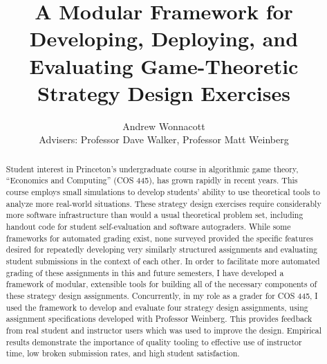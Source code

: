 \documentclass[pageno]{jpaper}
\begin{document}
\title{
A Modular Framework for Developing, Deploying, and Evaluating Game-Theoretic Strategy Design Exercises}

\author{Andrew Wonnacott\\
  Advisers: Professor Dave Walker, Professor Matt Weinberg}

\date{}
\maketitle

\thispagestyle{empty}
\doublespacing{}
\begin{abstract}
  Student interest in Princeton's undergraduate course in algorithmic game theory, ``Economics and Computing'' (COS 445), has grown rapidly in recent years.
  This course employs small simulations to develop students' ability to use theoretical tools to analyze more real-world situations.
  These strategy design exercises require considerably more software infrastructure than would a usual theoretical problem set, including handout code for student self-evaluation and software autograders.
  While some frameworks for automated grading exist, none surveyed provided the specific features desired for repeatedly developing very similarly structured assignments and evaluating student submissions in the context of each other.
  In order to facilitate more automated grading of these assignments in this and future semesters, I have developed a framework of modular, extensible tools for building all of the necessary components of these strategy design assignments.
  Concurrently, in my role as a grader for COS 445, I used the framework to develop and evaluate four strategy design assignments, using assignment specifications developed with Professor Weinberg.
  This provides feedback from real student and instructor users which was used to improve the design.
  Empirical results demonstrate the importance of quality tooling to effective use of instructor time, low broken submission rates, and high student satisfaction.
\end{abstract}

\newpage
\end{document}

